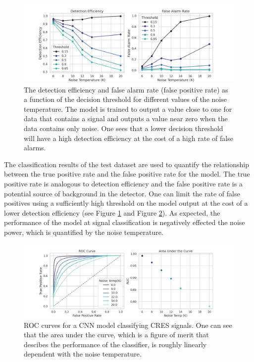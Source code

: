 \begin{figure}[htbp]
    \centering
    \includegraphics*[width=1.0\textwidth]{figs/Chapter-4/210625_plot_dfcnn_efficiency_vs_noise_temp.png}
    \caption{\label{fig:chap4-dfcnn-efficiency} The detection efficiency and false alarm rate (false positive rate) as a function of the decision threshold for different values of the noise temperature. The model is trained to output a value close to one for data that contains a signal and outputs a value near zero when the data contains only noise. One sees that a lower decision threshold will have a high detection efficiency at the cost of a high rate of false alarms. }
\end{figure}

The classification results of the test dataset are used to quantify the relationship between the true positive rate and the false positive rate for the model. The true positive rate is analogous to detection efficiency and the false positive rate is a potential source of background in the detector. One can limit the rate of false positives using a sufficiently high threshold on the model output at the cost of a lower detection efficiency (see Figure \ref{fig:chap4-dfcnn-efficiency} and Figure \ref{fig:chap4-dfcnn-roc}). As expected, the performance of the model at signal classification is negatively effected the noise power, which is quantified by the noise temperature.

\begin{figure}[htbp]
    \centering
    \includegraphics*[width=1.0\textwidth]{figs/Chapter-4/210625_plot_dfcnn_roc_vs_noise_temp.png}
    \caption{\label{fig:chap4-dfcnn-roc}ROC curves for a CNN model classifying CRES signals. One can see that the area under the curve, which is a figure of merit that descibes the performance of the classifier, is roughly linearly dependent with the noise temperature.}
\end{figure}



